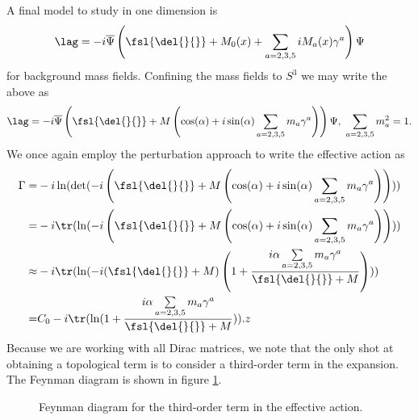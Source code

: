 A final model to study in one dimension is
\begin{align*}
	\lag = -i\overline{\Psi}\left(\fsl{\del{}{}} + M_{0}(x) + \sum\limits_{a = 2, 3, 5}iM_{a}(x)\gamma^{a}\right)\Psi
\end{align*}
for background mass fields. Confining the mass fields to $S^{3}$ we may write the above as
\begin{align*}
	\lag = -i\overline{\Psi}\left(\fsl{\del{}{}} + M\left(\cos(\alpha) + i\sin(\alpha)\sum\limits_{a = 2, 3, 5}m_{a}\gamma^{a}\right)\right)\Psi,\ \sum\limits_{a = 2, 3, 5}m_{a}^{2} = 1.
\end{align*}
We once again employ the perturbation approach to write the effective action as
\begin{align*}
	\Gamma =& -i\ln(\det(-i\left(\fsl{\del{}{}} + M\left(\cos(\alpha) + i\sin(\alpha)\sum\limits_{a = 2, 3, 5}m_{a}\gamma^{a}\right)\right))) \\
	       =& -i\tr(\ln(-i\left(\fsl{\del{}{}} + M\left(\cos(\alpha) + i\sin(\alpha)\sum\limits_{a = 2, 3, 5}m_{a}\gamma^{a}\right)\right))) \\
	 \approx& -i\tr(\ln(-i(\fsl{\del{}{}} + M)\left(1 + \frac{i\alpha\sum\limits_{a = 2, 3, 5}m_{a}\gamma^{a}}{\fsl{\del{}{}} + M}\right))) \\
	       =& C_{0} - i\tr(\ln(1 + \frac{i\alpha\sum\limits_{a = 2, 3, 5}m_{a}\gamma^{a}}{\fsl{\del{}{}} + M})).
z\end{align*}
Because we are working with all Dirac matrices, we note that the only shot at obtaining a topological term is to consider a third-order term in the expansion. The Feynman diagram is shown in figure \ref{fig:third_order_fd}.

\begin{figure}[!ht]
	\centering
	\caption{Feynman diagram for the third-order term in the effective action.}
	\label{fig:third_order_fd}
\end{figure}

